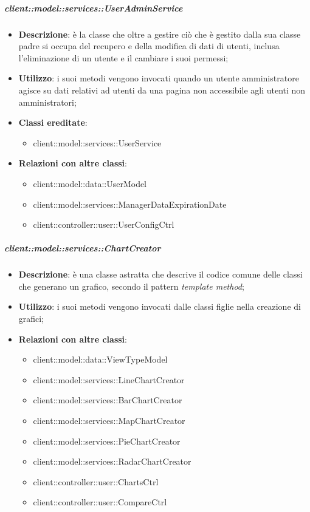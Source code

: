 		\subparagraph{client::model::services::UserAdminService} %
		\label{subp:client_model_services_useradminservice}
			\begin{itemize}
				\item \textbf{Descrizione}: è la classe che oltre a gestire ciò che è gestito dalla sua classe padre si occupa del recupero e della modifica di dati di utenti, inclusa l'eliminazione di un utente e il cambiare i suoi permessi;
				\item \textbf{Utilizzo}: i suoi metodi vengono invocati quando un utente amministratore agisce su dati relativi ad utenti da una pagina non accessibile agli utenti non amministratori;
				\item \textbf{Classi ereditate}:
					\begin{itemize}
						\item client::model::services::UserService
					\end{itemize}
				\item \textbf{Relazioni con altre classi}:
					\begin{itemize}
						\item client::model::data::UserModel
						\item client::model::services::ManagerDataExpirationDate
						\item client::controller::user::UserConfigCtrl
					\end{itemize}
				\end{itemize}

		\subparagraph{client::model::services::ChartCreator} %
		\label{subp:chartcreator}
			\begin{itemize}
				\item \textbf{Descrizione}: è una classe astratta che descrive il codice comune delle classi che generano un grafico, secondo il pattern \emph{template method};
				\item \textbf{Utilizzo}: i suoi metodi vengono invocati dalle classi figlie nella creazione di grafici;
				\item \textbf{Relazioni con altre classi}:
					\begin{itemize}
						\item client::model::data::ViewTypeModel
						\item client::model::services::LineChartCreator
						\item client::model::services::BarChartCreator
						\item client::model::services::MapChartCreator
						\item client::model::services::PieChartCreator
						\item client::model::services::RadarChartCreator
						\item client::controller::user::ChartsCtrl
						\item client::controller::user::CompareCtrl
					\end{itemize}
			\end{itemize}

